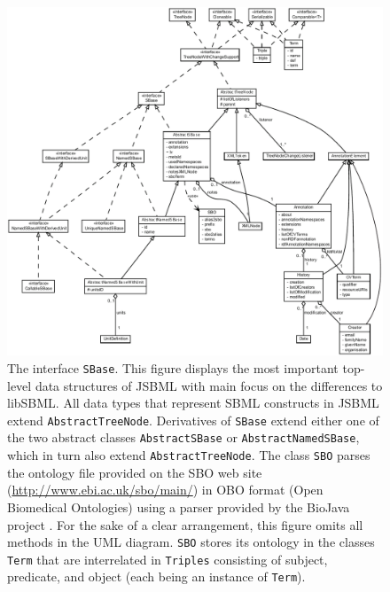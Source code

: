 \begin{figure}[p]
 \centering
 \includegraphics[width=\textwidth]{img/SBase.pdf}
 \caption[The interface \texttt{SBase}]{The interface \texttt{SBase}. 
This figure displays the most important top-level data
structures of JSBML with main focus on the differences to libSBML. All data
types that represent SBML constructs in JSBML extend \texttt{AbstractTreeNode}. 
Derivatives of \texttt{SBase} extend either one of the two abstract classes
\texttt{AbstractSBase} or \texttt{AbstractNamedSBase}, which in turn also extend
\texttt{AbstractTreeNode}. The class \texttt{SBO} parses the
ontology file provided on the SBO web site
(\url{http://www.ebi.ac.uk/sbo/main/}) in OBO format (Open Biomedical
Ontologies) using a parser provided by the BioJava project \citep{Holland2008}.
For the sake of a clear arrangement, this figure omits all methods in the UML
diagram. \texttt{SBO} stores its ontology in the classes \texttt{Term} that are
interrelated in \texttt{Triples} consisting of subject, predicate, and object
(each being an instance of \texttt{Term}).}
\end{figure}
